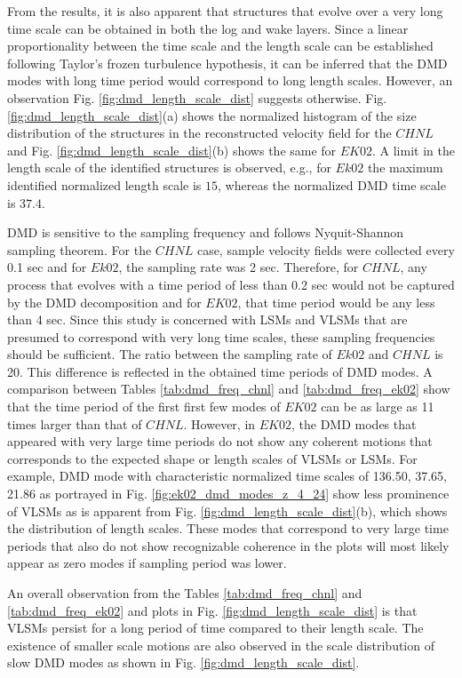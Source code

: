 From the results, it is also apparent that structures that evolve over a very long time scale can be obtained in both the log and wake layers. Since a linear proportionality between the time scale and the length scale can be established following Taylor's frozen turbulence hypothesis, it can be inferred that the DMD modes with long time period would correspond to long length scales. However, an observation Fig. \ref{fig:dmd_length_scale_dist} suggests otherwise. Fig. \ref{fig:dmd_length_scale_dist}(a) shows the normalized histogram of the size distribution of the structures in the reconstructed velocity field for the $CHNL$ and Fig. \ref{fig:dmd_length_scale_dist}(b) shows the same for $EK02$. A limit in the length scale of the identified structures is observed, e.g., for $Ek02$ the maximum identified normalized length scale is $15$, whereas the normalized DMD time scale is $37.4$. 

DMD is sensitive to the sampling frequency and follows Nyquit-Shannon sampling theorem. For the $CHNL$ case, sample velocity fields were collected every 0.1 sec and for $Ek02$, the sampling rate was 2 sec. Therefore, for $CHNL$, any process that evolves with a time period of less than 0.2 sec would not be captured by the DMD decomposition and for $EK02$, that time period would be any less than 4 sec. Since this study is concerned with LSMs and VLSMs that are presumed to correspond with very long time scales, these sampling frequencies should be sufficient. The ratio between the sampling rate of $Ek02$ and $CHNL$ is 20. This difference is reflected in the obtained time periods of DMD modes. A comparison between Tables \ref{tab:dmd_freq_chnl} and \ref{tab:dmd_freq_ek02} show that the time period of the first first few modes of $EK02$ can be as large as 11 times larger than that of $CHNL$. However, in $EK02$, the DMD modes that appeared with very large time periods do not show any coherent motions that corresponds to the expected shape or length scales of VLSMs or LSMs. For example, DMD mode with characteristic normalized time scales of 136.50, 37.65, 21.86 as portrayed in Fig.  \ref{fig:ek02_dmd_modes_z_4_24} show less prominence of VLSMs as is apparent from Fig.  \ref{fig:dmd_length_scale_dist}(b), which shows the distribution of length scales. These modes that correspond to very large time periods that also do not show recognizable coherence in the plots will most likely appear as zero modes if sampling period was lower. 

An overall observation from the Tables \ref{tab:dmd_freq_chnl} and \ref{tab:dmd_freq_ek02} and plots in Fig. \ref{fig:dmd_length_scale_dist} is that VLSMs persist for a long period of time compared to their length scale. The existence of smaller scale motions are also observed in the scale distribution of slow DMD modes as shown in Fig. \ref{fig:dmd_length_scale_dist}. 

